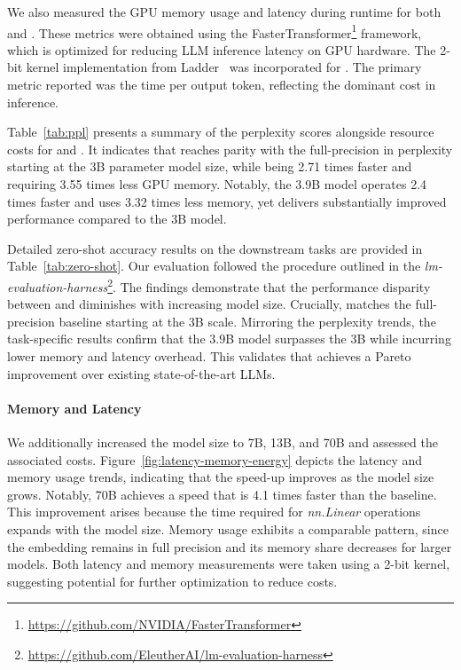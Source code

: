 We also measured the GPU memory usage and latency during runtime for both  and . These metrics were obtained using the FasterTransformer\footnote{\url{https://github.com/NVIDIA/FasterTransformer}} framework, which is optimized for reducing LLM inference latency on GPU hardware. The 2-bit kernel implementation from Ladder~\cite{ladder} was incorporated for . The primary metric reported was the time per output token, reflecting the dominant cost in inference.

Table~\ref{tab:ppl} presents a summary of the perplexity scores alongside resource costs for  and . It indicates that  reaches parity with the full-precision  in perplexity starting at the 3B parameter model size, while being 2.71 times faster and requiring 3.55 times less GPU memory. Notably, the 3.9B  model operates 2.4 times faster and uses 3.32 times less memory, yet delivers substantially improved performance compared to the  3B model.

Detailed zero-shot accuracy results on the downstream tasks are provided in Table~\ref{tab:zero-shot}. Our evaluation followed the procedure outlined in the \emph{lm-evaluation-harness}\footnote{\url{https://github.com/EleutherAI/lm-evaluation-harness}}. The findings demonstrate that the performance disparity between  and  diminishes with increasing model size. Crucially,  matches the full-precision baseline starting at the 3B scale. Mirroring the perplexity trends, the task-specific results confirm that the 3.9B  model surpasses the 3B  while incurring lower memory and latency overhead. This validates that  achieves a Pareto improvement over existing state-of-the-art LLMs.

\paragraph{Memory and Latency}

We additionally increased the model size to 7B, 13B, and 70B and assessed the associated costs. Figure~\ref{fig:latency-memory-energy} depicts the latency and memory usage trends, indicating that the speed-up improves as the model size grows. Notably,  70B achieves a speed that is 4.1 times faster than the  baseline. This improvement arises because the time required for \emph{nn.Linear} operations expands with the model size. Memory usage exhibits a comparable pattern, since the embedding remains in full precision and its memory share decreases for larger models. Both latency and memory measurements were taken using a 2-bit kernel, suggesting potential for further optimization to reduce costs.


